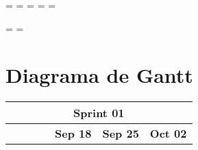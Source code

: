 \newpage
\paperwidth=\pdfpageheight
\paperheight=\pdfpagewidth
\pdfpageheight=\paperheight
\pdfpagewidth=\paperwidth
\headwidth=\textheight

\begingroup
    \vsize=\textwidth
    \hsize=\textheight
    \section{Diagrama de Gantt}
    \label{sec:gantt}
    \begin{table}[h]
        \centering
        \begin{tabular}{|llcllllllllllllllll|}
        \hline
        \multicolumn{19}{|c|}{\cellcolor[HTML]{8EA9D8}\textbf{Sprint 01}}                                                                                                                                                                                                                                                                                                                                                                                                                                                                                                                                                                                                                                                                                                                                                                                                                            \\ \hline
        \multicolumn{1}{|c|}{\cellcolor[HTML]{FFFFFF}}                                                             & \multicolumn{1}{c|}{\cellcolor[HTML]{FFFFFF}}                                  & \multicolumn{1}{c|}{\cellcolor[HTML]{FFFFFF}}                                    & \multicolumn{1}{c|}{\cellcolor[HTML]{FFFFFF}}                                        & \multicolumn{5}{c|}{\cellcolor[HTML]{FFFFFF}\textbf{Sep 18}}                                                                                                            & \multicolumn{5}{c|}{\cellcolor[HTML]{FFFFFF}\textbf{Sep 25}}                                                                                                            & \multicolumn{5}{c|}{\cellcolor[HTML]{FFFFFF}\textbf{Oct 02}}                                                                                                     \\ \cline{5-19} 

\end{tabular}
\end{table}
